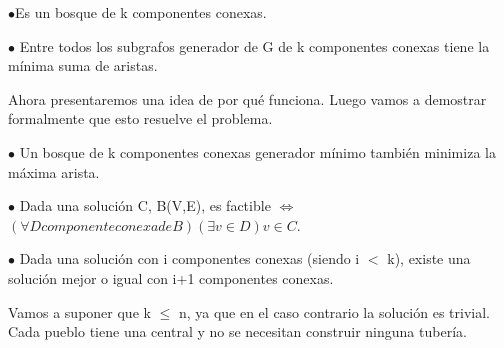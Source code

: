 $\bullet$Es un bosque de k componentes conexas.

$\bullet$ Entre todos los subgrafos generador de G de k componentes conexas tiene la mínima suma de aristas.

Ahora presentaremos una idea de por qué funciona. Luego vamos a demostrar formalmente que esto resuelve el problema. 

$\bullet$ Un bosque de k componentes conexas generador mínimo también minimiza la máxima arista.

$\bullet$ Dada una solución C, B(V,E), es factible $\Longleftrightarrow$ $(\forall D componente conexa de B)(\exists v \in D) v \in C$.  

$\bullet$ Dada una solución con i componentes conexas (siendo i $<$ k), existe una solución mejor o igual con i+1 componentes conexas.

Vamos a suponer que k $\leq$ n, ya que en el caso contrario la solución es trivial. Cada pueblo tiene una central y no se necesitan construir ninguna tubería.